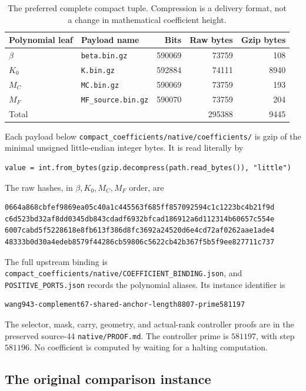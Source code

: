 \documentclass[11pt,a4paper]{article}
\theoremstyle{definition}
\newcommand{\MC}{M_C}
\newcommand{\MF}{M_F}
\newcommand{\src}[1]{{\urlstyle{tt}\nolinkurl{#1}}}
\begin{document}
\begin{table}[htbp]
\centering\small
\begin{tabular}{@{}llrrr@{}}
\toprule
Polynomial leaf & Payload name & Bits & Raw bytes & Gzip bytes\\
\midrule
\(\beta\)&\src{beta.bin.gz}&590069&73759&108\\
\(K_0\)&\src{K.bin.gz}&592884&74111&8940\\
\(\MC\)&\src{MC.bin.gz}&590069&73759&193\\
\(\MF\)&\src{MF_source.bin.gz}&590070&73759&204\\
\midrule
Total&&&295388&9445\\
\bottomrule
\end{tabular}
\caption{The preferred complete compact tuple. Compression is a
delivery format, not a change in mathematical coefficient height.}
\end{table}

Each payload below \src{compact_coefficients/native/coefficients/}
is gzip of the minimal unsigned little-endian integer bytes.
It is read literally by
\begin{lstlisting}
value = int.from_bytes(gzip.decompress(path.read_bytes()), "little")
\end{lstlisting}
The raw hashes, in \(\beta,K_0,\MC,\MF\) order, are
\begin{lstlisting}
0664a868cbfef9869ea05c40a1c445563f685ff857092594c1c1223bc4b21f9d
c6d523bd32af8dd0345db843cdadf6932bfcad186912a6d112314b60657c554e
6007cabd5f5228618e8fb613f386d8fc3692a24520d6e4cd72af0262aae1ade4
48333b0d30a4edeb8579f44286cb59806c5622cb42b367f5b5f9ee827711c737
\end{lstlisting}
The full upstream binding is
\src{compact_coefficients/native/COEFFICIENT_BINDING.json},
and \src{POSITIVE_PORTS.json} records the polynomial aliases.
Its instance identifier is
\begin{lstlisting}
wang943-complement67-shared-anchor-length8807-prime581197
\end{lstlisting}
The selector, mask, carry, geometry, and actual-rank controller
proofs are in the preserved source-44 \src{native/PROOF.md}.
The controller prime is \(581197\), with step \(581196\).
No coefficient is computed by waiting for a halting computation.

\subsection{The original comparison instance}
\end{document}
